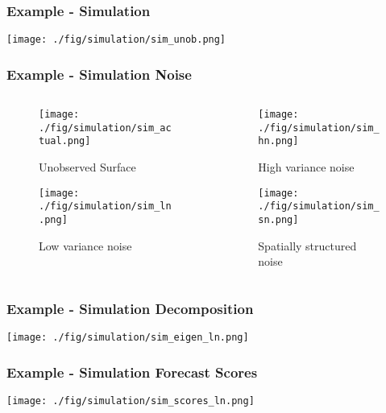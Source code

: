 \documentclass[aspectratio=169]{beamer}
\begin{document}
  \begin{frame}
    \frametitle{Example - Simulation}
    \begin{center}
      \texttt{[image: ./fig/simulation/sim\_unob.png]}
    \end{center}
  \end{frame}
  \begin{frame}
    \frametitle{Example - Simulation Noise}
    \begin{columns}[t]
      \begin{column}{.5\textwidth}
      \begin{figure}
        \texttt{[image: ./fig/simulation/sim\_actual.png]}
      \caption{Unobserved Surface}
      \end{figure}%
      \begin{figure}
      \texttt{[image: ./fig/simulation/sim\_ln.png]}
      \caption{Low variance noise}
      \end{figure}
      \end{column}
      \begin{column}{.5\textwidth}
      \begin{figure}
      \texttt{[image: ./fig/simulation/sim\_hn.png]}
      \caption{High variance noise}
      \end{figure}%
      \begin{figure}
      \texttt{[image: ./fig/simulation/sim\_sn.png]}
      \caption{Spatially structured noise}
      \end{figure}
      \end{column}
    \end{columns}
  \end{frame}
  \begin{frame}
    \frametitle{Example - Simulation Decomposition}
    \begin{center}
      \texttt{[image: ./fig/simulation/sim\_eigen\_ln.png]}
    \end{center}
  \end{frame}
  
  \begin{frame}
    \frametitle{Example - Simulation Forecast Scores}
    \begin{center}
      \texttt{[image: ./fig/simulation/sim\_scores\_ln.png]}
    \end{center}
  \end{frame}
  
\end{document}
